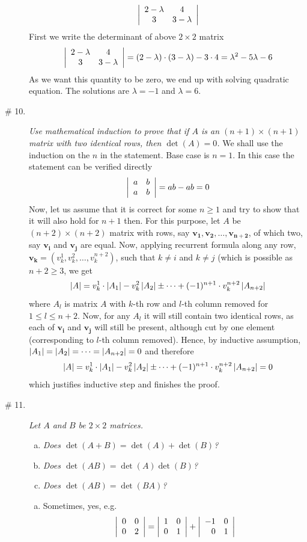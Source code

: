 \documentclass[8pt]{article} %
\begin{document}
\begin{description}
{	\[\mydet{cc}{2-\lambda&4\\3&3-\lambda}\]
	First we write the determinant of above $2\times2$ matrix
	\[\mydet{cc}{2-\lambda&4\\3&3-\lambda}=(2-\lambda)\cdot(3-\lambda)-3\cdot4=\lambda^2-5\lambda-6\]
	As we want this quantity to be zero, we end up with solving quadratic equation. The solutions are $\lambda=-1$ and $\lambda=6$.
	}
\item[\# 10.]{{\it Use mathematical induction to prove that if $A$ is an $(n+1)\times(n+1)$ matrix with two identical rows, then $\det(A)=0$.}
	We shall use the induction on the $n$ in the statement. Base case is $n=1$. In this case the statement can be verified directly
	\[\mydet{cc}{a&b\\a&b}=ab-ab=0\]
	Now, let us assume that it is correct for some $n\geq 1$ and try to show that it will also hold for $n+1$ then. For this purpose, let
	$A$ be $(n+2)\times(n+2)$ matrix with rows, say $\mathbf{v_1},\mathbf{v_2},\dots,\mathbf{v_{n+2}}$, of which two, say $\mathbf{v_i}$
	and $\mathbf{v_j}$ are equal. Now, applying recurrent formula along any row, $\mathbf{v_k}=(v_k^1,v_k^2,\dots,v_k^{n+2})$,
	such that $k\neq i$ and $k\neq j$ (which is possible as $n+2\geq 3$, we get
	\[\myabs{A}=v_k^1\cdot\myabs{A_1}-v_k^2\myabs{A_2}\pm\dots+(-1)^{n+1}\cdot v_k^{n+2}\myabs{A_{n+2}}\]
	where $A_l$ is matrix $A$ with $k$-th row and $l$-th column removed for $1\leq l\leq n+2$. Now, for any $A_l$ it will still contain two 
	identical rows, as each of $\mathbf{v_i}$ and $\mathbf{v_j}$ will still be present, although cut by one element (corresponding to $l$-th
	column removed). Hence, by inductive assumption, $\myabs{A_1}=\myabs{A_2}=\dots=\myabs{A_{n+2}}=0$ and therefore
	\[\myabs{A}=v_k^1\cdot\myabs{A_1}-v_k^2\myabs{A_2}\pm\dots+(-1)^{n+1}\cdot v_k^{n+2}\myabs{A_{n+2}}=0\]
	which justifies inductive step and finishes the proof.
	}
\item[\# 11.]{{\it Let $A$ and $B$ be $2\times2$ matrices.}
	\begin{enumerate}[(a)]
		\item{\it Does $\det(A+B)=\det(A)+\det(B)$?}
		\item{\it Does $\det(AB)=\det(A)\det(B)$?}
		\item{\it Does $\det(AB)=\det(BA)$?}
	\end{enumerate}
	\begin{enumerate}[(a)]
		\item Sometimes, yes, e.g.
			\[\mydet{rr}{0&0\\0&2}=\mydet{rr}{1&0\\0&1}+\mydet{rr}{-1&0\\0&1}\]

\end{enumerate}}
\end{description}
\end{document}
